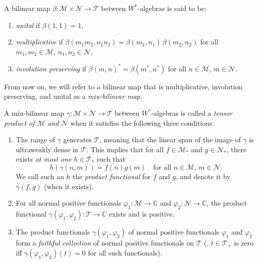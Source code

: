 \begin{definition}
  A bilinear map \( \beta:  \mathscr{M} \times  \mathscr{N} \to  \mathscr{T} \) between $W^*$-algebras is said to be:
\begin{enumerate}
    \item \emph{unital} if \( \beta(1,1) = 1 \),
    \item \emph{multiplicative} if \( \beta(m_1m_2, n_1n_2) = \beta(m_1, n_1) \, \beta(m_2, n_2) \) for all \( m_1, m_2 \in \mathscr{M} \), \( n_1, n_2  \in \mathscr{N}\),
    \item \emph{involution preserving} if \( \beta(m, n)^* = \beta(m^*, n^*) \) for all \( n \in \mathscr{M} \), \( m \in \mathscr{N} \).
\end{enumerate}
From now on, we will refer to a bilinear map that is multiplicative, involution preserving, and unital as a \emph{miu-bilinear map}.
\end{definition}


\begin{definition}
  A miu-bilinear map \( \gamma: \mathscr{M} \times \mathscr{N} \to \mathscr{T} \) between $W^*$-algebras is called a \emph{tensor product of \( \mathscr{M} \) and \( \mathscr{N} \)} when it satisfies the following three conditions:

\begin{enumerate}
    \item The range of \( \gamma \) generates \( \mathscr{T} \), meaning that the linear span of the image of \( \gamma \) is ultraweakly dense in \( \mathscr{T} \). This implies that for all \( f \in \mathscr{M}_* \) and \(g \in \mathscr{N}_* \), there exists \emph{at most one} \( h \in \mathscr{T}_* \) such that
    \[
    h(\gamma(n, m)) = f(n) g(m) \quad \text{for all } n \in \mathscr{M}, \, m \in \mathscr{N}.
    \]
    We call such an \( h \) the \emph{product functional} for \( f \) and \(g\), and denote it by \( \gamma(f, g) \) (when it exists).

    \item For all normal positive functionals \( \varphi_1: \mathscr{M} \to \mathbb{C} \) and \(  \varphi_2: \mathscr{N} \to \mathbb{C} \), the product functional \( \gamma( \varphi_1,  \varphi_2): \mathscr{T} \to \mathbb{C} \) exists and is positive.

    \item The product functionals \( \gamma( \varphi_1,  \varphi_2) \) of normal positive functionals \( \varphi_1 \) and \( \varphi_2\) form a \emph{faithful collection} of normal positive functionals on \( \mathscr{T} \) (\ie, \( t \in \mathscr{T}_+ \) is zero iff \( \gamma(\varphi_1, \varphi_2)(t) = 0 \) for all such functionals).

\end{enumerate}
\end{definition}

